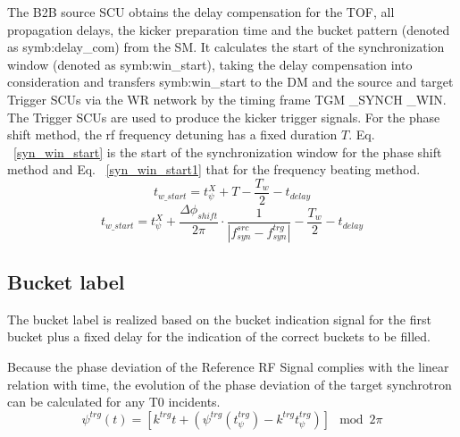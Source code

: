 The B2B source SCU obtains the delay compensation for the TOF, all propagation delays, the kicker preparation time and the bucket pattern (denoted as \gls{symb:delay_com}) from the SM. It calculates the start of the synchronization window (denoted as \gls{symb:win_start}), taking the delay compensation into consideration and transfers \gls{symb:win_start} to the DM and the source and target Trigger SCUs via the WR network by the timing frame TGM \_SYNCH \_WIN. The Trigger SCUs are used to produce the kicker trigger signals. For the phase shift method, the rf frequency detuning has a fixed duration $T$. Eq. ~\ref{syn_win_start} is the start of the synchronization window for the phase shift method and Eq. ~\ref{syn_win_start1} that for the frequency beating method.
\begin{equation}
t_\mathit{w\_start}=t_\psi^\mathit{X}+T-\frac{T_w}{2}-t_\mathit{delay}\label{syn_win_start}
\end{equation}
\begin{equation}
t_\mathit{w\_start}= t_\psi^\mathit{X}+\frac{\Delta \phi_\mathit{shift}}{2\pi}\cdot\frac{1}{|f_{\mathit{syn}}^\mathit{src}-f_{\mathit{syn}}^\mathit{trg}|}-\frac{T_w}{2}-t_\mathit{delay}\label{syn_win_start1}
\end{equation}

\subsection{Bucket label}
\label{sec:bucket_label}
The bucket label is realized based on the bucket indication signal for the first bucket plus a fixed delay for the indication of the correct buckets to be filled. 

Because the phase deviation of the Reference RF Signal complies with the linear relation with time, the evolution of the phase deviation of the target synchrotron can be calculated for any T0 incidents. 
\begin{equation}
\psi^\mathit{trg}(t)= [k^\mathit{trg}t+(\psi^\mathit{trg}(t_\mathit{\psi}^\mathit{trg})-k^\mathit{trg}t_\mathit{\psi}^\mathit{trg})] \mod 2\pi
\end{equation}

